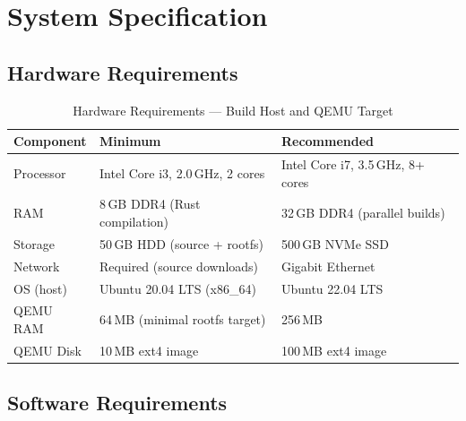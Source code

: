 \documentclass[12pt,a4paper]{report}
\begin{document}
\chapter{System Specification}

\section{Hardware Requirements}

\begin{table}[H]
\centering
\caption{Hardware Requirements --- Build Host and QEMU Target}
\renewcommand{\arraystretch}{1.25}
\begin{tabularx}{\linewidth}{l X X}
\toprule
\textbf{Component} & \textbf{Minimum} & \textbf{Recommended}\\
\midrule
Processor  & Intel Core i3, 2.0\,GHz, 2 cores  & Intel Core i7, 3.5\,GHz, 8+ cores\\
RAM        & 8\,GB DDR4 (Rust compilation)      & 32\,GB DDR4 (parallel builds)\\
Storage    & 50\,GB HDD (source + rootfs)       & 500\,GB NVMe SSD\\
Network    & Required (source downloads)        & Gigabit Ethernet\\
OS (host)  & Ubuntu 20.04 LTS (x86\_64)         & Ubuntu 22.04 LTS\\
QEMU RAM   & 64\,MB (minimal rootfs target)     & 256\,MB\\
QEMU Disk  & 10\,MB ext4 image                  & 100\,MB ext4 image\\
\bottomrule
\end{tabularx}
\end{table}

\section{Software Requirements}
\end{document}
